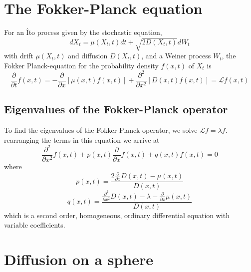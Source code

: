 \documentclass[12pt]{book}
\begin{document}
\section{The Fokker-Planck equation}\label{section_theFokkerPlanckEquation}
For an \^{I}to process given by the stochastic equation, 
\begin{equation*}
dX_t=\mu(X_t,t)dt+\sqrt{2D(X_t,t)}dW_t
\end{equation*}
with drift $\mu(X_t,t)$ and diffusion $D(X_t,t)$, and a Weiner process $W_t$, the Fokker Planck-equation for the probability density $f(x,t)$ of $X_t$ is 
\begin{equation*}
\frac{\partial}{\partial t}f(x,t)=-\frac{\partial}{\partial x}[\mu(x,t)f(x,t)]+\frac{\partial^2}{\partial x^2}[D(x,t)f(x,t)]=\mathcal{L}f(x,t)
\end{equation*}
\subsection{Eigenvalues of the Fokker-Planck operator }\label{subsection_eigenvaluesOfTheFokkerPlanckOperator}
To find the eigenvalues of the Fokker Planck operator, we solve $\mathcal{L}f = \lambda f$.
rearranging the terms in this equation we arrive at 
\begin{equation*}
\frac{\partial^2}{\partial x^2}f(x,t) +p(x,t)\frac{\partial}{\partial x}f(x,t) +q(x,t)f(x,t) = 0
\end{equation*}
where 
\begin{equation*}
p(x,t) = \frac{2\frac{\partial}{\partial x}D(x,t)-\mu(x,t)}{D(x,t)}
\end{equation*}
\begin{equation*}
q(x,t)=\frac{\frac{\partial^2}{\partial x^2}D(x,t)-\lambda-\frac{\partial}{\partial x}\mu(x,t)}{D(x,t)}
\end{equation*}
which is a second order, homogeneous, ordinary differential equation with variable coefficients. 

\section{Diffusion on a sphere}


\end{document}
